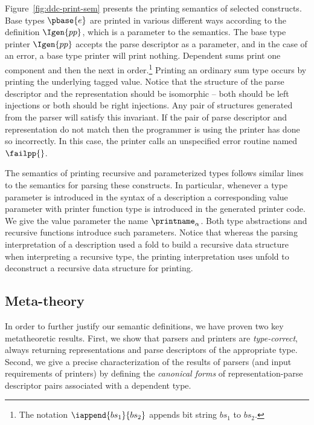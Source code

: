 Figure~\ref{fig:ddc-print-sem} presents the printing semantics of
selected \ddc{} constructs.  Base types $\pbase{e}$ are printed in
various different ways according to the definition
$\Igen{pp}$, which is a parameter to the semantics.  The base type
printer $\Igen{pp}$ accepts the parse descriptor as a parameter, and
in the case of an error, a base type printer will print nothing.
Dependent sums print one component and then the next in order.\footnote{The
notation $\iappend{bs_1}{bs_2}$ appends bit string $bs_1$ to $bs_2$.}
Printing an ordinary sum type occurs by printing the underlying
tagged value.  Notice that the structure of the parse descriptor
and the representation should be isomorphic -- both should be
left injections or both should be right injections.  Any pair
of structures generated from the parser will satisfy this invariant.
If the pair of parse descriptor and representation do not match then the
programmer is using the printer has done so incorrectly.  In this case,
the printer calls an unspecified error routine named $\failpp{}$.

The semantics of printing recursive and parameterized types follows
similar lines to the semantics for parsing these constructs.
In particular, whenever a type parameter is introduced in the syntax
of a description a corresponding value parameter with printer function type 
is introduced in the generated printer code. We give the value parameter
the name $\printname_\alpha$.  Both type abstractions and recursive functions
introduce such parameters.  Notice that whereas the parsing interpretation
of a description used a fold to build a recursive data structure
when interpreting a recursive type, the printing interpretation uses
unfold to deconstruct a recursive data structure for printing.  

\subsection{Meta-theory}
\label{sec:meta-theory}
In order to further justify our semantic definitions,
we have proven two key metatheoretic results.  First, we show that
parsers and printers are {\em type-correct}, always returning representations
and parse descriptors of the appropriate type.  Second, we give a precise
characterization of the results of parsers
(and input requirements of printers) by defining the {\em canonical forms}
of representation-parse descriptor pairs associated with a
dependent \ddc{} type.


